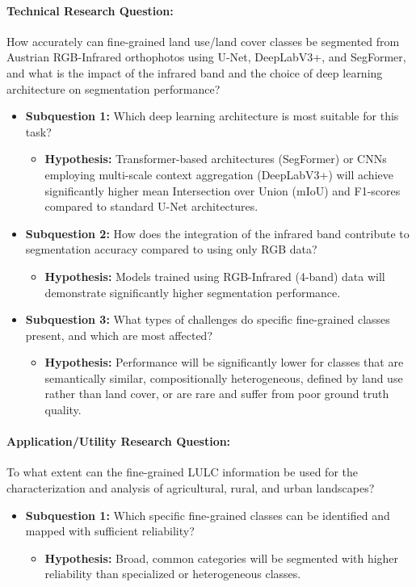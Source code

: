 \documentclass{report}
\begin{document}
\paragraph{Technical Research Question:} How accurately can fine-grained land use/land cover classes be segmented from Austrian RGB-Infrared orthophotos using U-Net, DeepLabV3+, and SegFormer, and what is the impact of the infrared band and the choice of deep learning architecture on segmentation performance?
\begin{itemize}
\item \textbf{Subquestion 1:} Which deep learning architecture is most suitable for this task?
\begin{itemize}
\item \textbf{Hypothesis:} Transformer-based architectures (SegFormer) or CNNs employing multi-scale context aggregation (DeepLabV3+) will achieve significantly higher mean Intersection over Union (mIoU) and F1-scores compared to standard U-Net architectures.
\end{itemize}
\item \textbf{Subquestion 2:} How does the integration of the infrared band contribute to segmentation accuracy compared to using only RGB data?
\begin{itemize}
\item \textbf{Hypothesis:} Models trained using RGB-Infrared (4-band) data will demonstrate significantly higher segmentation performance.
\end{itemize}
\item \textbf{Subquestion 3:} What types of challenges do specific fine-grained classes present, and which are most affected?
\begin{itemize}
\item \textbf{Hypothesis:} Performance will be significantly lower for classes that are semantically similar, compositionally heterogeneous, defined by land use rather than land cover, or are rare and suffer from poor ground truth quality.
\end{itemize}
\end{itemize}
\paragraph{Application/Utility Research Question:} To what extent can the fine-grained LULC information be used for the characterization and analysis of agricultural, rural, and urban landscapes?
\begin{itemize}
\item \textbf{Subquestion 1:} Which specific fine-grained classes can be identified and mapped with sufficient reliability?
\begin{itemize}
\item \textbf{Hypothesis:} Broad, common categories will be segmented with higher reliability than specialized or heterogeneous classes.
\end{itemize}
\end{itemize}
\end{document}
